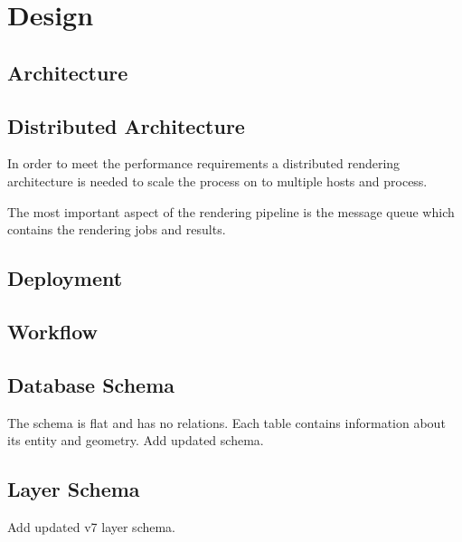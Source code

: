\chapter{Design}\label{design}

\section{Architecture}

\section{Distributed Architecture}

In order to meet the performance requirements a distributed rendering architecture 
is needed to scale the process on to multiple hosts and process.

The most important aspect of the rendering pipeline is the message queue which contains the rendering jobs and results.

\newpage
\section{Deployment}\label{deployment}


\newpage
\section{Workflow}\label{workflow}

\newpage
\section{Database Schema}\label{database-schema}
The schema is flat and has no relations. Each table contains information about its entity and geometry. 
Add updated  schema.


\newpage
\section{Layer Schema}\label{layer-schema}

Add updated v7 layer schema.

